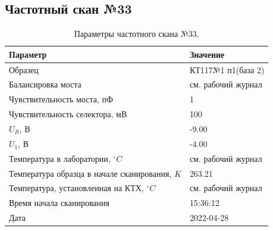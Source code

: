 \subsection{Частотный скан №33}
\begin{table}[!ht]
    \centering
    \caption{Параметры частотного скана №33.}
    \begin{tabular}{|l|l|}
        \hline
        Параметр                                       & Значение                  \\ \hline
        Образец                                        & КТ117№1 п1(база 2)        \\ \hline
        Балансировка моста                             & см. рабочий журнал        \\ \hline
        Чувствительность моста, пФ                     & 1                         \\ \hline
        Чувствительность селектора, мВ                 & 100                       \\ \hline
        $U_R$, В                                       & -9.00                     \\ \hline
        $U_1$, В                                       & -4.00                     \\ \hline
        Температура в лаборатории, $^\circ C$          & см. рабочий журнал        \\ \hline
        Температура образца в начале сканирования, $K$ & 263.21                    \\ \hline
        Температура, установленная на КТХ, $^\circ C$  & см. рабочий журнал        \\ \hline
        Время начала сканирования                      & 15:36:12                  \\ \hline
        Дата                                           & 2022-04-28                \\ \hline
    \end{tabular}
    \label{table:frequency_scan_33}
\end{table}

